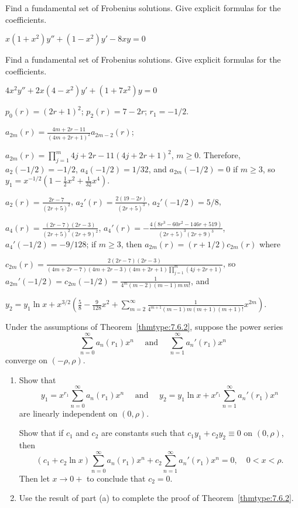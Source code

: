 \documentclass{ximera}
\begin{document}
\begin{problem}\label{exer:7.6.51}
Find a
fundamental set of Frobenius solutions. Give explicit formulas for the
coefficients.

$x(1+x^2)y''+(1-x^2)y'-8xy=0$
\end{problem}

\begin{problem}\label{exer:7.6.52}
Find a
fundamental set of Frobenius solutions. Give explicit formulas for the
coefficients.

$4x^2y''+2x(4-x^2)y'+(1+7x^2)y=0$

\begin{solution}
    $p_0(r)=(2r+1)^2$;
$p_2(r)=7-2r$;
$r_1=-1/2$.

$a_{2m}(r)=\frac{4m+2r-11}{(4m+2r+1)^2}
a_{2m-2}(r)$;

 $a_{2m}(r)=\prod_{j=1}^m{4j+2r-11}{(4j+2r+1)^2}$,
$m\geq 0$. Therefore,$a_2(-1/2)=-1/2$, $a_4(-1/2)=1/32$, and
$a_{2m}(-1/2)=0$ if $m\geq 3$, so
$y_1=x^{-1/2}\left(1-\frac{1}{2}x^2+\frac{1}{32}x^4\right)$.



$a_2(r)=\frac{2r-7}{(2r+5)^2}$,
$a_2'(r)=\frac{2(19-2r)}{(2r+5)^3}$,
$a_2'(-1/2)=5/8$,


$a_4(r)=\frac{(2r-7)(2r-3)}{(2r+5)^2(2r+9)^2}$,
$a_4'(r)=-\frac{4(8r^3-60r^2-146r+519)}{(2r+5)^3(2r+9)^3}$,
$a_4'(-1/2)=-9/128$; if $m\geq 3$, then $a_{2m}(r)=(r+1/2)c_{2m}(r)$
where

$c_{2m}(r)=\frac{2(2r-7)(2r-3)}{(4m+2r-7)(4m+2r-3)(4m+2r+1)\prod_{j=1}^m
(4j+2r+1)}$, so
$a_{2m}'(-1/2)=c_{2m}(-1/2)=\frac{1}{4^m(m-2)(m-1)m\,m!}$, and

$y_2=y_1\ln x+x^{3/2}\left(\frac{5}{8}-\frac{9}{128}x^2
+\sum_{m=2}^\infty\frac{1}{4^{m+1}(m-1)m(m+1)(m+1)!}x^{2m}\right)$.
\end{solution}
\end{problem}

\begin{problem}\label{exer:7.6.53}
Under the assumptions of Theorem~\ref{thmtype:7.6.2}, suppose
the power series
$$
\sum_{n=0}^\infty a_n(r_1)x^n \quad\mbox{ and }\quad
\sum_{n=1}^\infty a_n'(r_1)x^n
$$
  converge on $(-\rho,\rho)$.
\begin{enumerate}
\item %
Show that
$$
y_1=x^{r_1}\sum_{n=0}^\infty a_n(r_1)x^n\quad\mbox{ and }\quad
y_2=y_1\ln x+x^{r_1}\sum_{n=1}^\infty a_n'(r_1)x^n
$$
are linearly independent on $(0,\rho)$. 

\begin{hint}
Show that if $c_1$
and $c_2$ are constants such that $c_1y_1+c_2y_2\equiv0$ on $(0,\rho)$,
then
$$
(c_1+c_2\ln x)\sum_{n=0}^\infty a_n(r_1)x^n+
c_2\sum_{n=1}^\infty a_n'(r_1)x^n=0,\quad 0<x<\rho.
$$
Then let $x\to0+$ to conclude that $c_2=0$.
\end{hint}

\item %
Use the result of part (a) to
complete the proof of Theorem~\ref{thmtype:7.6.2}.
\end{enumerate}
\end{problem}
\end{document}
